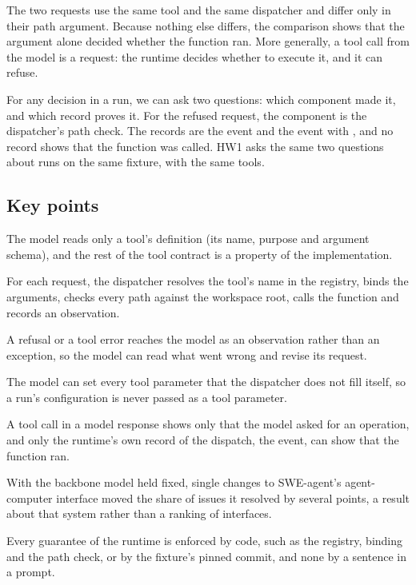 The two requests use the same tool and the same dispatcher and differ only in their path argument.
Because nothing else differs, the comparison shows that the argument alone decided whether the
function ran. More generally, a tool call from the model is a request: the runtime decides whether to
execute it, and it can refuse.

For any decision in a run, we can ask two questions: which component made it, and which record proves
it. For the refused request, the component is the dispatcher's path check. The records are the
 event and the  event with , and no
record shows that the function was called. HW1 asks the same two questions about runs on the same
fixture, with the same tools.

\subsection*{Key points}
\bi
\item The model reads only a tool's definition (its name, purpose and argument schema), and the rest
of the tool contract is a property of the implementation.
\item For each request, the dispatcher resolves the tool's name in the registry, binds the arguments,
checks every path against the workspace root, calls the function and records an observation.
\item A refusal or a tool error reaches the model as an observation rather than an exception, so the
model can read what went wrong and revise its request.
\item The model can set every tool parameter that the dispatcher does not fill itself, so a run's
configuration is never passed as a tool parameter.
\item A tool call in a model response shows only that the model asked for an operation, and only the
runtime's own record of the dispatch, the  event, can show that the function
ran.
\item With the backbone model held fixed, single changes to SWE-agent's agent-computer interface moved
the share of issues it resolved by several points, a result about that system rather than a ranking
of interfaces.
\item Every guarantee of the runtime is enforced by code, such as the registry, binding and the path
check, or by the fixture's pinned commit, and none by a sentence in a prompt.
\ei

\clearpage
